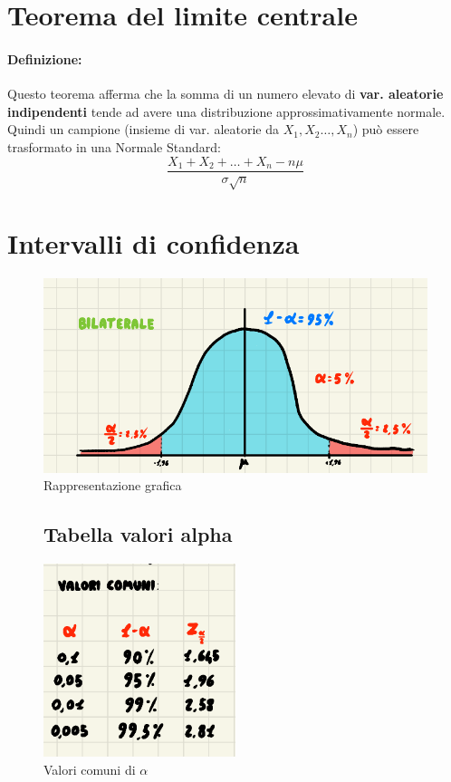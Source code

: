 \documentclass[]{article}
\newcommand{\definizione}{\paragraph{Definizione:}}
\begin{document}
    \section{Teorema del limite centrale}
    \definizione Questo teorema afferma che la somma di un numero elevato di \textbf{var. aleatorie indipendenti} tende ad avere una distribuzione approssimativamente normale.\\
    Quindi un campione (insieme di var. aleatorie da $X_1, X_2\ldots, X_n$) può essere trasformato in una Normale Standard:
    \[ \frac{X_1 + X_2 + \ldots + X_n - n\mu}{\sigma \sqrt{n}} \]
    \section{Intervalli di confidenza}
    \begin{figure}[H]
        \caption{Rappresentazione grafica}
        \includegraphics[width=\textwidth]{images/boh_16.png}
    \end{figure}
    \begin{figure}[H]
        \subsection{Tabella valori alpha}
        \centering
            \caption{Valori comuni di $\alpha$}
            \includegraphics[width=0.5\textwidth]{images/boh_19.png}
    \end{figure}
\end{document}
